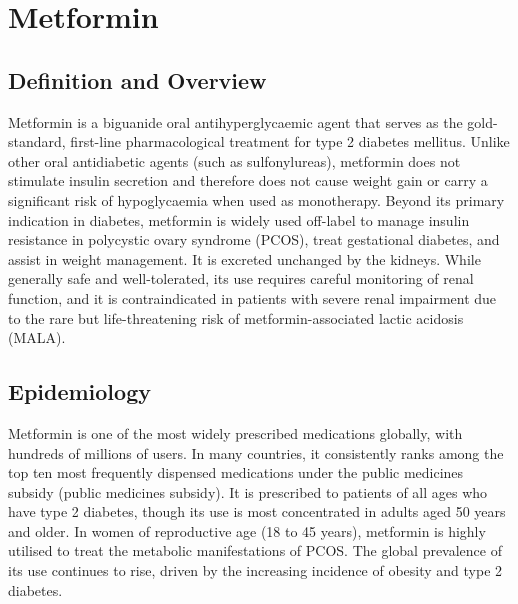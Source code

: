 \chapter{Metformin}

\section*{Definition and Overview}
Metformin is a biguanide oral antihyperglycaemic agent that serves as the gold-standard, first-line pharmacological treatment for type 2 diabetes mellitus. Unlike other oral antidiabetic agents (such as sulfonylureas), metformin does not stimulate insulin secretion and therefore does not cause weight gain or carry a significant risk of hypoglycaemia when used as monotherapy. Beyond its primary indication in diabetes, metformin is widely used off-label to manage insulin resistance in polycystic ovary syndrome (PCOS), treat gestational diabetes, and assist in weight management. It is excreted unchanged by the kidneys. While generally safe and well-tolerated, its use requires careful monitoring of renal function, and it is contraindicated in patients with severe renal impairment due to the rare but life-threatening risk of metformin-associated lactic acidosis (MALA).

\section*{Epidemiology}
Metformin is one of the most widely prescribed medications globally, with hundreds of millions of users. In many countries, it consistently ranks among the top ten most frequently dispensed medications under the public medicines subsidy (public medicines subsidy). It is prescribed to patients of all ages who have type 2 diabetes, though its use is most concentrated in adults aged 50 years and older. In women of reproductive age (18 to 45 years), metformin is highly utilised to treat the metabolic manifestations of PCOS. The global prevalence of its use continues to rise, driven by the increasing incidence of obesity and type 2 diabetes.

